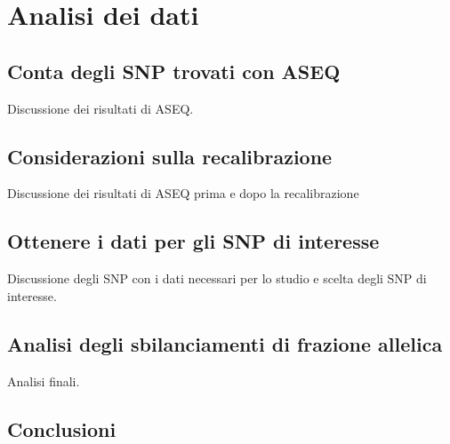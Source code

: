\chapter{Analisi dei dati}
\label{cha:analisi}

\section{Conta degli SNP trovati con ASEQ}
\label{sec:snp_count}
Discussione dei risultati di ASEQ.

\section{Considerazioni sulla recalibrazione}
\label{sec:rec_cons}
Discussione dei risultati di ASEQ prima e dopo la recalibrazione

\section{Ottenere i dati per gli SNP di interesse}
\label{sec:snp_filter}
Discussione degli SNP con i dati necessari per lo studio e scelta degli SNP di interesse.

\section{Analisi degli sbilanciamenti di frazione allelica}
\label{sec:allelic_frac_cons}
Analisi finali.

\section{Conclusioni}
\label{sec:ending}
